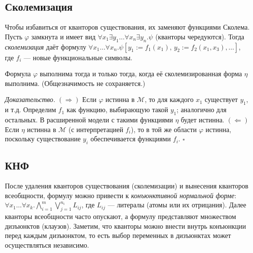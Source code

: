 \documentclass[10pt]{article}
\begin{document}
\subsection{Сколемизация}
Чтобы избавиться от кванторов существования, их заменяют функциями Сколема. Пусть $\varphi$ замкнута и имеет вид $\forall x_1\exists y_1\dots\forall x_n\exists y_n.\psi$ (кванторы чередуются). Тогда \textit{сколемизация} даёт формулу
$\forall x_1\dots\forall x_n.\psi[y_1:=f_1(x_1),\,y_2:=f_2(x_1,x_3),\dots]$, где $f_i$ — новые функциональные символы.
\begin{theorem}[Сколема]
Формула $\varphi$ выполнима тогда и только тогда, когда её сколемизированная форма $\eta$ выполнима. (Общезначимость не сохраняется.)
\end{theorem}
\textit{Доказательство.} $(\Rightarrow)$ Если $\varphi$ истинна в $\mathcal{M}$, то для каждого $x_1$ существует $y_1$, и т.д. Определим $f_1$ как функцию, выбирающую такой $y_1$; аналогично для остальных. В расширенной модели с такими функциями $\eta$ будет истинна. $(\Leftarrow)$ Если $\eta$ истинна в $\mathcal{M}$ (с интерпретацией $f_i$), то в той же области $\varphi$ истинна, поскольку существование $y_i$ обеспечивается функциями $f_i$. \hfill $\square$

\subsection{КНФ}
После удаления кванторов существования (сколемизации) и вынесения кванторов всеобщности, формулу можно привести к \textit{конъюнктивной нормальной форме}:
$\forall x_1\dots\forall x_k.\bigwedge_{i=1}^m \bigvee_{j=1}^{n_i} L_{ij}$,
где $L_{ij}$ — литералы (атомы или их отрицания). Далее кванторы всеобщности часто опускают, а формулу представляют множеством дизъюнктов (клаузов). Заметим, что кванторы можно внести внутрь конъюнкции перед каждым дизъюнктом, то есть выбор переменных в дизъюнктах может осуществляться независимо.
\end{document}
